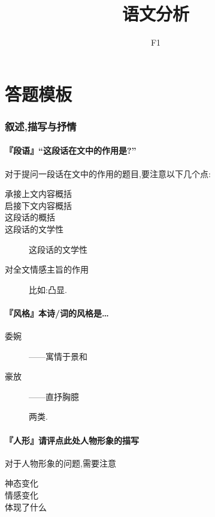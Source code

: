 \documentclass{ctexart}
\begin{document}
\title{语文分析}
\author{F1}
\maketitle
\linespread{1.48}

\tableofcontents
\clearpage
\part{答题模板}

\section{叙述,描写与抒情}

\subsection{『段语』``这段话在文中的作用是?''}
对于提问一段话在文中的作用的题目,要注意以下几个点:

\begin{description}
	\item[承接上文内容概括]
	\item[启接下文内容概括]
	\item[这段话的概括]
	\item[这段话的文学性] 这段话的文学性
	\item[对全文情感主旨的作用]  比如:凸显.
\end{description}

\subsection{『风格』本诗/词的风格是…}

\begin{description}
	\item[委婉]——寓情于景和
	\item[豪放]——直抒胸臆

	两类.
\end{description}

\subsection{『人形』请评点此处人物形象的描写}

对于人物形象的问题,需要注意

\begin{description}
	\item[神态变化]
	\item[情感变化]
	\item[体现了什么]
\end{description}
\end{document}
